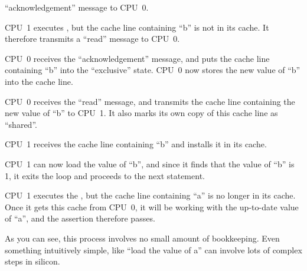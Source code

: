 \begin{sequence}
	``acknowledgement'' message to CPU~0.
\item	CPU~1 executes , but the cache line
	containing ``b'' is not in its cache.
	It therefore transmits a ``read'' message to CPU~0.
\item	CPU~0 receives the ``acknowledgement'' message, and puts
	the cache line containing ``b'' into the ``exclusive'' state.
	CPU~0 now stores the new value of ``b'' into the cache line.
\item	CPU~0 receives the ``read'' message, and transmits the
	cache line containing the new value of ``b''
	to CPU~1.
	It also marks its own copy of this cache line as ``shared''.%
	\label{seq:app:whymb:Store buffers: All copies shared}
\item	CPU~1 receives the cache line containing ``b'' and installs
	it in its cache.
\item	CPU~1 can now load the value of ``b'',
	and since it finds that the value of ``b'' is 1, it
	exits the  loop and proceeds
	to the next statement.
\item	CPU~1 executes the , but the cache line containing
	``a'' is no longer in its cache.
	Once it gets this cache from CPU~0, it will be
	working with the up-to-date value of ``a'', and the assertion
	therefore passes.
\end{sequence}

\QuickQuizEnd

As you can see, this process involves no small amount of bookkeeping.
Even something intuitively simple, like ``load the value of a'' can
involve lots of complex steps in silicon.

